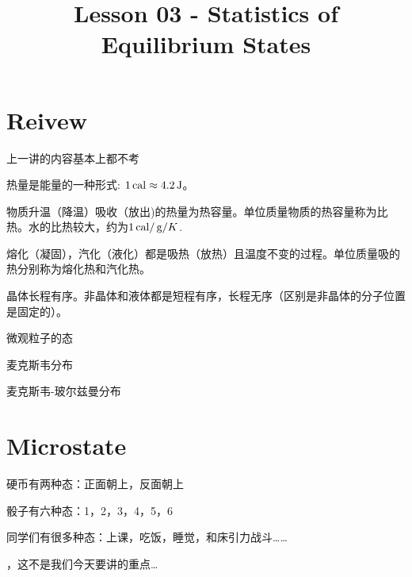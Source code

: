 \documentclass[CJK]{beamer}
\title{Lesson 03 - Statistics of Equilibrium States}
\author{}
\date{}
\begin{document}

\section{Reivew}

\begin{frame}
\bch
上一讲的内容基本上都不考
\ech
\end{frame}

\begin{frame}
\bch
\bitem
\item{热量是能量的一种形式: $1 \,\mathrm{cal} \approx 4.2 \,\mathrm{J}$。}
\item{物质升温（降温）吸收（放出)的热量为热容量。单位质量物质的热容量称为比热。水的比热较大，约为$1\,\mathrm{cal}/\,\mathrm{g}/K$.}
\item{熔化（凝固），汽化（液化）都是吸热（放热）且温度不变的过程。单位质量吸的热分别称为熔化热和汽化热。}
\item{晶体长程有序。非晶体和液体都是短程有序，长程无序（区别是非晶体的分子位置是固定的）。}
\eitem
\ech
\end{frame}


\begin{frame}
\bch
\bitem
\item{微观粒子的态}
\item{麦克斯韦分布}
\item{麦克斯韦-玻尔兹曼分布}
\eitem
\ech
\end{frame}

\section{Microstate}




\begin{frame}
\bch
\bitem
\item{硬币有两种态：正面朝上，反面朝上

}
\item{骰子有六种态：1，2，3，4，5，6

}
\item{同学们有很多种态：上课，吃饭，睡觉，和床引力战斗……

}

\eitem
\ech
\end{frame}

\begin{frame}
\bch


\skipline

，这不是我们今天要讲的重点…
\ech
\end{frame}
\end{document}
